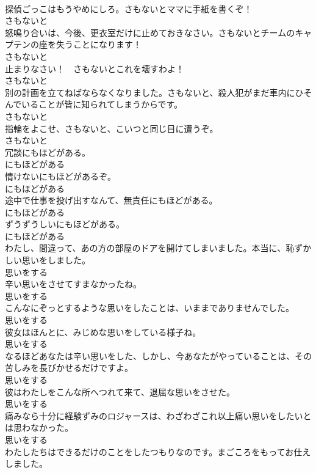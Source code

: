 \documentclass[8pt]{extreport}
\begin{document}
\begin{CJK}{UTF8}{min}
\\	探偵ごっこはもうやめにしろ。さもないとママに手紙を書くぞ！	
\\	さもないと
\\	怒鳴り合いは、今後、更衣室だけに止めておきなさい。さもないとチームのキャプテンの座を失うことになります！	
\\	さもないと
\\	止まりなさい！　さもないとこれを壊すわよ！	
\\	さもないと
\\	別の計画を立てねばならなくなりました。さもないと、殺人犯がまだ車内にひそんでいることが皆に知られてしまうからです。	
\\	さもないと
\\	指輪をよこせ、さもないと、こいつと同じ目に遭うぞ。	
\\	さもないと
\\	冗談にもほどがある。	
\\	にもほどがある
\\	情けないにもほどがあるぞ。	
\\	にもほどがある
\\	途中で仕事を投げ出すなんて、無責任にもほどがある。	
\\	にもほどがある
\\	ずうずうしいにもほどがある。	
\\	にもほどがある
\\	わたし、間違って、あの方の部屋のドアを開けてしまいました。本当に、恥ずかしい思いをしました。	
\\	思いをする
\\	辛い思いをさせてすまなかったね。	
\\	思いをする
\\	こんなにぞっとするような思いをしたことは、いままでありませんでした。	
\\	思いをする
\\	彼女はほんとに、みじめな思いをしている様子ね。	
\\	思いをする
\\	なるほどあなたは辛い思いをした、しかし、今あなたがやっていることは、その苦しみを長びかせるだけですよ。	
\\	思いをする
\\	彼はわたしをこんな所へつれて来て、退屈な思いをさせた。	
\\	思いをする
\\	痛みなら十分に経験ずみのロジャースは、わざわざこれ以上痛い思いをしたいとは思わなかった。	
\\	思いをする
\\	わたしたちはできるだけのことをしたつもりなのです。まごころをもってお仕えしました。	

\end{CJK}
\end{document}
